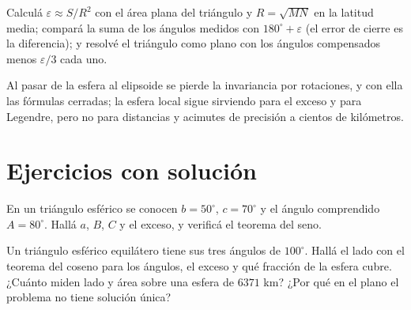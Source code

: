 \begin{resultado}
Calculá \(\varepsilon\approx S/R^2\) con el área plana del triángulo y \(R=\sqrt{MN}\) en la
latitud media; compará la suma de los ángulos medidos con \(180^\circ+\varepsilon\) (el
error de cierre es la diferencia); y resolvé el triángulo como plano con los ángulos
compensados menos \(\varepsilon/3\) cada uno.
\end{resultado}

\begin{idea}
Al pasar de la esfera al elipsoide se pierde la invariancia por rotaciones, y con ella las
fórmulas cerradas; la esfera local sigue sirviendo para el exceso y para Legendre, pero no
para distancias y acimutes de precisión a cientos de kilómetros.
\end{idea}

\section{Ejercicios con solución}

\begin{ejercicio}\label{ex:esfera-lal}
En un triángulo esférico se conocen \(b=50^\circ\), \(c=70^\circ\) y el ángulo comprendido
\(A=80^\circ\). Hallá \(a\), \(B\), \(C\) y el exceso, y verificá el teorema del seno.
\end{ejercicio}

\begin{ejercicio}\label{ex:esfera-polar}
Un triángulo esférico equilátero tiene sus tres ángulos de \(100^\circ\). Hallá el lado con
el teorema del coseno para los ángulos, el exceso y qué fracción de la esfera cubre. ¿Cuánto
miden lado y área sobre una esfera de \(6371\) km? ¿Por qué en el plano el problema no tiene
solución única?
\end{ejercicio}

